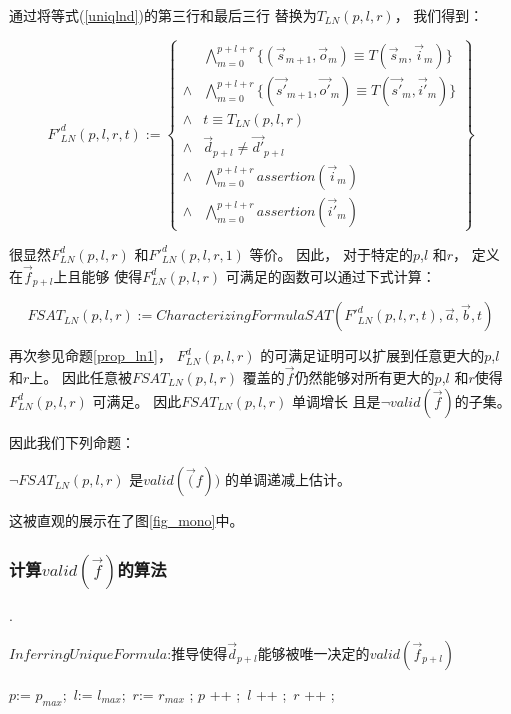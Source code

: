 通过将等式(\ref{uniqlnd})的第三行和最后三行 替换为$T_{LN}(p,l,r)$，
我们得到：

\begin{equation}\label{lndef1}
F'^d_{LN}(p,l,r,t):=
\left\{
\begin{array}{cc}
&\bigwedge_{m=0}^{p+l+r}
\{
(\vec{s}_{m+1},\vec{o}_m)\equiv T(\vec{s}_m,\vec{i}_m)
\}
\\
\wedge&\bigwedge_{m=0}^{p+l+r}
\{
(\vec{s'}_{m+1},\vec{o'}_m)\equiv T(\vec{s'}_m,\vec{i'}_m)
\}
\\
\wedge& t\equiv T_{LN}(p,l,r)\\
\wedge& \vec{d}_{p+l}\ne \vec{d'}_{p+l} \\
\wedge&\bigwedge_{m=0}^{p+l+r}assertion(\vec{i}_m) \\
\wedge&\bigwedge_{m=0}^{p+l+r}assertion(\vec{i'}_m)
\end{array}
\right\}
\end{equation}

很显然$F^d_{LN}(p,l,r)$ 和$F'^d_{LN}(p,l,r,1)$ 等价。
因此，
对于特定的$p$,$l$ 和$r$，
定义在$\vec{f}_{p+l}$上且能够 使得$F^d_{LN}(p,l,r)$ 可满足的函数可以通过下式计算：

\begin{equation}\label{fsat_ln}
FSAT_{LN}(p,l,r):=CharacterizingFormulaSAT(F'^d_{LN}(p,l,r,t),\vec{a},\vec{b},t)
\end{equation}

再次参见命题\ref{prop_ln1}，
$F^d_{LN}(p,l,r)$ 的可满足证明可以扩展到任意更大的$p$,$l$ 和$r$上。
因此任意被$FSAT_{LN}(p,l,r)$ 覆盖的$\vec{f}$仍然能够对所有更大的$p$,$l$ 和$r$使得$F^d_{LN}(p,l,r)$ 可满足。
因此$FSAT_{LN}(p,l,r)$ 单调增长
且是$\neg valid(\vec{f})$的子集。

因此我们下列命题：

\begin{proposition}\label{prop_ln}
$\neg FSAT_{LN}(p,l,r)$ 是$valid(\vec(f))$ 的单调递减上估计。
\end{proposition}

这被直观的展示在了图\ref{fig_mono}中。


\subsubsection{\textbf{计算$valid(\vec{f})$的算法}}\label{subsub_overal}.

\begin{algorithm}[t]
\caption{$InferringUniqueFormula$:推导使得$\vec{d}_{p+l}$能够被唯一决定的$valid(\vec{f}_{p+l})$}
\label{algo_infer}
\begin{algorithmic}[1]
\STATE $p$:= $p_{max}$;~$l$:= $l_{max}$;~$r$:= $r_{max}$ ;
  \STATE $p$ ++ ;~$l$ ++ ;~$r$ ++ ;
\ENDWHILE
{}
\end{algorithmic}
\end{algorithm}

